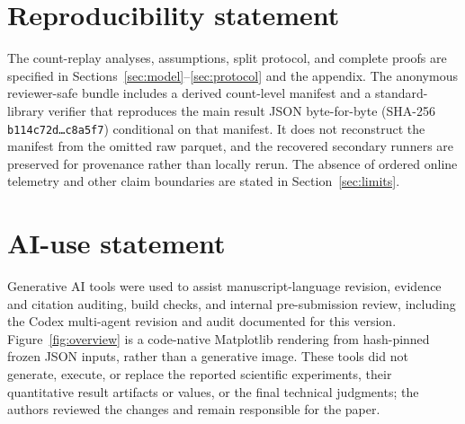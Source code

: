 \documentclass{article}
\theoremstyle{definition}
\theoremstyle{remark}
\begin{document}
\section*{Reproducibility statement}
The count-replay analyses, assumptions, split protocol, and complete proofs
are specified in Sections~\ref{sec:model}--\ref{sec:protocol} and the
appendix. The anonymous reviewer-safe bundle includes a derived count-level
manifest and a standard-library verifier that reproduces the main result JSON
byte-for-byte (SHA-256 \texttt{b114c72d\ldots c8a5f7}) conditional on that
manifest. It does not reconstruct the manifest from the omitted raw parquet,
and the recovered secondary runners are preserved for provenance rather than
locally rerun. The absence of ordered online telemetry and other claim
boundaries are stated in Section~\ref{sec:limits}.

\section*{AI-use statement}
Generative AI tools were used to assist manuscript-language revision, evidence
and citation auditing, build checks, and internal pre-submission review,
including the Codex multi-agent revision and audit documented for this version.
Figure~\ref{fig:overview} is a code-native Matplotlib rendering from
hash-pinned frozen JSON inputs, rather than a generative image. These tools did
not generate, execute, or replace the reported scientific experiments, their
quantitative result artifacts or values, or the final technical judgments; the
authors reviewed the changes and remain responsible for the paper.




\appendix



\end{document}
